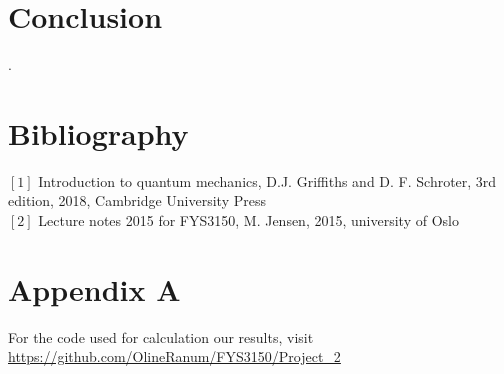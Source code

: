 \documentclass[%
reprint,
amsmath,amssymb,
aps,
]{revtex4-1}
\begin{document}
\section*{Conclusion}


\newpage .
\newpage 
\onecolumngrid
\section*{Bibliography}
\noindent $[1]$ Introduction to quantum mechanics, D.J. Griffiths and D. F. Schroter, 3rd edition, 2018, Cambridge University Press\\ 
$[2]$ Lecture notes 2015 for FYS3150, M. Jensen, 2015, university of Oslo
\section*{Appendix A}
For the code used for calculation our results, visit
\url{https://github.com/OlineRanum/FYS3150/Project_2}
\end{document}
